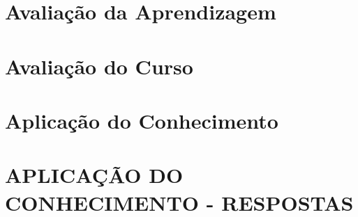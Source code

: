 \postextual
%

%
\begin{apendicesenv}
    \chapter{Avaliação da Aprendizagem}\label{apend-a}
    
    
    \chapter{Avaliação do Curso}\label{apend-b}
    
    
    \chapter{Aplicação do Conhecimento}\label{apend-c}
    
    
    \chapter{APLICAÇÃO DO CONHECIMENTO - RESPOSTAS}\label{apend-d}
    
    
%

\end{apendicesenv}

